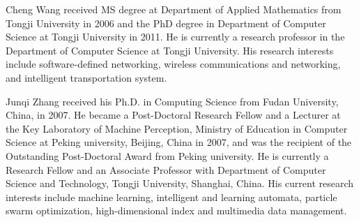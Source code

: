 \documentclass[journal]{IEEEtran}
\begin{document}
\begin{IEEEbiography}{Cheng Wang}
received MS degree at Department of Applied Mathematics from Tongji University in 2006 and the PhD degree in Department of Computer Science at Tongji University in 2011. He is currently a research professor in the Department of Computer Science at Tongji University. His research interests include software-defined networking, wireless communications and networking, and intelligent transportation system.
\end{IEEEbiography}




\begin{IEEEbiography}
{Junqi Zhang} received his Ph.D. in Computing Science from Fudan
University, China, in 2007. He became a Post-Doctoral Research Fellow and a Lecturer at the Key
Laboratory of Machine Perception,
Ministry of Education in Computer Science at Peking
university, Beijing, China in 2007, and was the recipient of the Outstanding Post-Doctoral Award
from Peking university. He is currently a Research Fellow and an
Associate Professor with Department of Computer Science and
Technology, Tongji University, Shanghai, China. His current research
interests include machine learning, intelligent and learning
automata, particle swarm optimization,
high-dimensional index and multimedia data
management.
\end{IEEEbiography}
\end{document}
